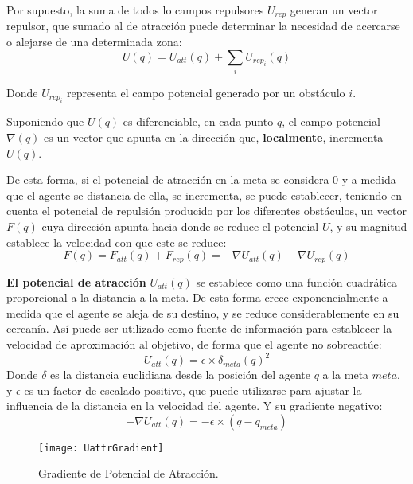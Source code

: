 Por supuesto, la suma de todos lo campos repulsores $U_{rep}$ generan un vector repulsor, que sumado al de atracción puede determinar la necesidad de acercarse o alejarse de una determinada zona:
\begin{equation}
U(q) = U_\mathit{att}(q) + \sum_i{U_\mathit{rep_i}(q)}
\label{equation:UqTotal}
\end{equation}

Donde $U_{rep_i}$ representa el campo potencial generado por un obstáculo $i$.

Suponiendo que $U(q)$ es diferenciable, en cada punto $q$, el campo potencial $\nabla(q)$ es un vector que apunta en la dirección que, \textbf{localmente}, incrementa $U(q)$. 

De esta forma, si el potencial de atracción en la meta se considera 0 y a medida que el agente se distancia de ella, se incrementa, se puede establecer, teniendo en cuenta el potencial de repulsión producido por los diferentes obstáculos, un vector $F(q)$ cuya dirección apunta hacia donde se reduce el potencial $U$, y su magnitud establece la velocidad con que este se reduce:
\begin{equation}
F(q) = F_\mathit{att}(q) + F_\mathit{rep}(q) = -\nabla U_\mathit{att}(q) - \nabla U_\mathit{rep}(q)
\label{equation:Fq}
\end{equation}


\textbf{El potencial de atracción} $U_\mathit{att}(q)$ se establece como una función cuadrática proporcional a la distancia a la meta. De esta forma crece exponencialmente a medida que el agente se aleja de su destino, y se reduce considerablemente en su cercanía. Así puede ser utilizado como fuente de información para establecer la velocidad de aproximación al objetivo, de forma que el agente no sobreactúe:
\begin{equation}
U_\mathit{att}(q) = \epsilon \times \delta_\mathit{meta}(q)^2
\label{equation:Uatt}
\end{equation}
Donde $\delta$ es la distancia euclidiana desde la posición del agente $q$ a la meta $meta$, y $\epsilon$ es un factor de escalado positivo, que puede utilizarse para ajustar la influencia de la distancia en la velocidad del agente. Y su gradiente negativo: 
\begin{equation}
-\nabla U_{att}(q) = -\epsilon \times (q - q_\mathit{meta})
\label{equation:dUatt}
\end{equation}
\begin{figure}[H]
	\centering
	\texttt{[image: UattrGradient]}
	\caption{Gradiente de Potencial de Atracción.}\label{fig:uattrgrad}
\end{figure}

